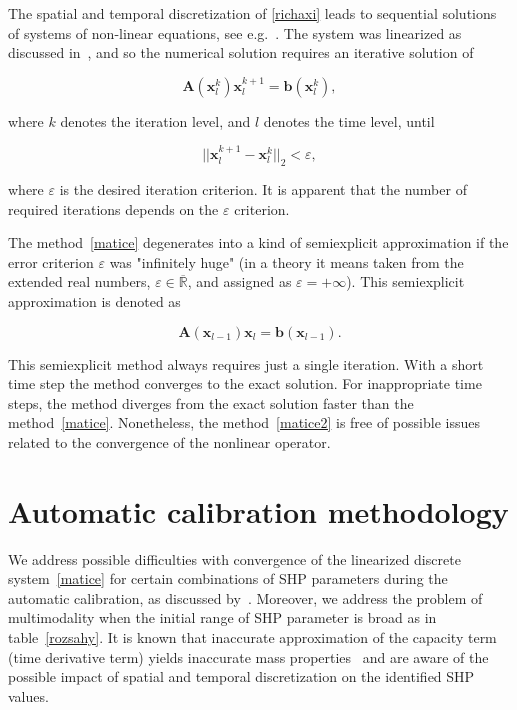 \documentclass[review,times,3p,twocolumn,10pt]{elsarticle}
\newenvironment{lineq}
    {\begin{linenomath*}
    \begin{equation}
    }
    { 
    \end{equation} 
    \end{linenomath*}
    }
\renewcommand{\vec}{\mathbf}
\begin{document}
 
 The spatial and temporal discretization of \eqref{richaxi} leads to sequential solutions of systems of non-linear equations, see e.g.~\citep{mojecomp}. The system was linearized as discussed in~\citet{mojeacta, mojeamc}, and so the numerical solution requires an iterative solution of 
\begin{lineq}
\label{matice}
\mathbf{A}(\vec{x}_l^k) \vec{x}_l^{k+1} = \vec{b}(\vec{x}_l^k),
\end{lineq}
where $k$ denotes the iteration level, and $l$ denotes the time level, until \begin{lineq} \label{picard} ||\vec{x}_l^{k+1} - \vec{x}_l^k||_2 < \varepsilon , \end{lineq} where $\varepsilon$ is the desired iteration criterion.  It is apparent that the number of required  iterations depends on the $\varepsilon$ criterion. 


The method~\eqref{matice} degenerates into a kind of semiexplicit approximation if the error criterion $\varepsilon$ was "infinitely huge" (in a theory it means taken from the extended real numbers, $\varepsilon \in {\overline {\mathbb {R} }}$, and assigned as $\varepsilon = + \infty$). This semiexplicit approximation is denoted as
\begin{lineq}
\label{matice2}
\mathbf{A}(\vec{x}_{l-1}) \vec{x}_l = \vec{b}(\vec{x}_{l-1}).
\end{lineq}
 This semiexplicit method always requires just a single  iteration. With a short time step the method converges to the exact solution. For inappropriate time steps, the method diverges from the exact solution faster than the method~\eqref{matice}. Nonetheless, the method~\eqref{matice2} is free of possible issues related to the convergence of the nonlinear operator.



\section{Automatic calibration methodology}%
\label{methodo}



We address possible difficulties with convergence of the linearized discrete system~\eqref{matice} for certain combinations of SHP parameters during the automatic calibration, as discussed by~\cite{beven2003-uncertain}.
Moreover, we address the problem of multimodality when the initial range of SHP parameter is broad as in table~\ref{rozsahy}.
It is known that inaccurate approximation of the capacity term (time derivative term) yields inaccurate mass properties~\citep{celia} and are aware of the possible impact of spatial and temporal discretization on the identified SHP values.  
\end{document}
